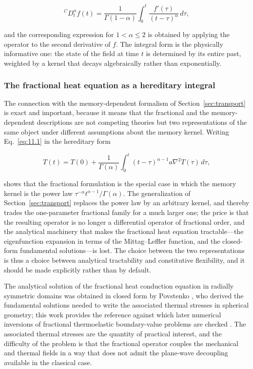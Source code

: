 \begin{equation}
{}^C D_t^\alpha f(t) = \frac{1}{\Gamma(1-\alpha)}\int_0^t \frac{f'(\tau)}{(t-\tau)^{\alpha}}\, d\tau ,
\label{eq:11.2}
\end{equation}

and the corresponding expression for $1 < \alpha \leq 2$ is obtained by applying the operator to the second derivative of $f$. The integral form is the physically informative one: the state of the field at time $t$ is determined by its entire past, weighted by a kernel that decays algebraically rather than exponentially.

\subsubsection{The fractional heat equation as a hereditary integral}

The connection with the memory-dependent formalism of Section~\ref{sec:transport} is exact and important, because it means that the fractional and the memory-dependent descriptions are not competing theories but two representations of the same object under different assumptions about the memory kernel. Writing Eq.~\eqref{eq:11.1} in the hereditary form

\begin{equation}
T(t) = T(0) + \frac{1}{\Gamma(\alpha)}\int_0^t (t-\tau)^{\alpha-1} a \nabla^2 T(\tau)\, d\tau ,
\label{eq:11.3}
\end{equation}

shows that the fractional formulation is the special case in which the memory kernel is the power law $\tau^{-\alpha}t^{\alpha-1}/\Gamma(\alpha)$. The generalization of Section~\ref{sec:transport} replaces the power law by an arbitrary kernel, and thereby trades the one-parameter fractional family for a much larger one; the price is that the resulting operator is no longer a differential operator of fractional order, and the analytical machinery that makes the fractional heat equation tractable---the eigenfunction expansion in terms of the Mittag--Leffler function, and the closed-form fundamental solutions---is lost. The choice between the two representations is thus a choice between analytical tractability and constitutive flexibility, and it should be made explicitly rather than by default.

The analytical solution of the fractional heat conduction equation in radially symmetric domains was obtained in closed form by Povstenko \cite{Povstenko2007}, who derived the fundamental solutions needed to write the associated thermal stresses in spherical geometry; this work provides the reference against which later numerical inversions of fractional thermoelastic boundary-value problems are checked \cite{Povstenko2004,Povstenko2009,Povstenko2011,Povstenko2016}. The associated thermal stresses are the quantity of practical interest, and the difficulty of the problem is that the fractional operator couples the mechanical and thermal fields in a way that does not admit the plane-wave decoupling available in the classical case.

